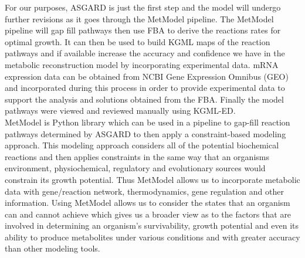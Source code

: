\indent\indent For our purposes, ASGARD is just the first step and the model will undergo further revisions as it goes through the MetModel pipeline.  The MetModel pipeline will gap fill pathways then use FBA to derive the reactions rates for optimal growth. It can then be used to build KGML maps of the reaction pathways and if available increase the accuracy and confidence we have in the metabolic reconstruction model by incorporating experimental data. mRNA expression data can be obtained from NCBI Gene Expression Omnibus (GEO) and incorporated during this process in order to provide experimental data to support the analysis and solutions obtained from the FBA. 
%
%
%
%
%
%
%
%
\indent Finally the model pathways were viewed and reviewed manually using KGML-ED\citep{klukas_dynamic_2007}. \\
\indent MetModel is Python library which can be used in a pipeline to gap-fill reaction pathways determined by ASGARD to then apply a constraint-based modeling approach.  This modeling approach considers all of the potential biochemical reactions and then applies constraints in the same way that an organisms environment, physiochemical, regulatory and evolutionary sources would constrain its growth potential. Thus MetModel allows us to incorporate metabolic data with gene/reaction network, thermodynamics, gene regulation and other information. Using MetModel allows us to consider the states that an organism can and cannot achieve which gives us a broader view as to the factors that are involved in determining an organism's survivability, growth potential and even its ability to produce metabolites under various conditions and with greater accuracy than other modeling tools\citep{roberts_proteomic_2009}. \\
%
%
%
%

